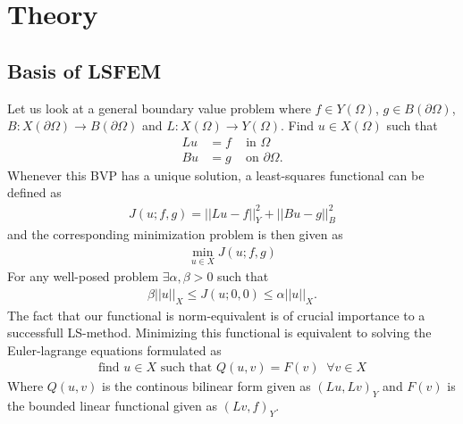 
\chapter{Theory} %

\label{chap:theory} %


\section{Basis of LSFEM}
Let us look at a general boundary value problem where $f \in Y(\Omega)$, $g \in B(\partial \Omega)$, $B\colon X(\partial \Omega) \to B(\partial\Omega) $ and $L\colon X(\Omega)\to Y(\Omega)$. Find $u \in X(\Omega) $ such that 
\begin{align}
	Lu &= f \; \; \; \text{ in } \Omega \\
	Bu &= g \; \; \; \text{ on } \partial \Omega.
	\label{eq:BVP}
\end{align}
Whenever this BVP has a unique solution, a least-squares functional can be defined as 
\begin{align}
	J(u;f,g) = ||Lu-f||^2_Y + ||Bu-g||^2_B
	\label{eq:FunctionalGen}
\end{align}
and the corresponding minimization problem is then given as 
\begin{align}
	\min_{u \in X}J(u;f,g)
	\label{eq:minProbGen}
\end{align}
For any well-posed problem $\exists \alpha,\beta > 0$ such that 
\begin{align}
	\beta||u||_X \leq J(u;0,0) \leq \alpha||u||_X.
	\label{eq:normEq}
\end{align}
The fact that our functional is norm-equivalent is of crucial importance to a successfull LS-method.  
Minimizing this functional is equivalent to solving the Euler-lagrange equations formulated as 
\begin{align}
	\text{find } u \in X \text{  such that  } Q(u,v) = F(v) \; \; \forall v\in X
	\label{eq:varFormGen}
\end{align}
Where $Q(u,v)$ is the continous bilinear form given as $(Lu,Lv)_Y$ and $F(v)$ is the bounded linear functional given as $(Lv,f)_Y$. ~\cite{Bochev}

